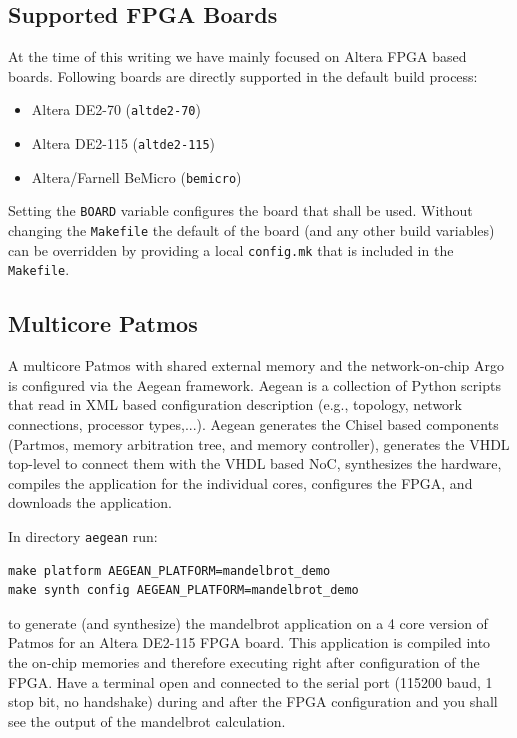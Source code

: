 \documentclass[a4paper,fontsize=10pt,twoside,DIV15,BCOR12mm,headinclude=true,footinclude=false,pagesize,bibtotoc]{scrbook}
\newcommand{\code}[1]{{\texttt{#1}}}
\newcommand{\comment}[3]{

\textsf{\textbf{#1}} {\color{#3}#2}}
\newcommand{\martin}[1]{\comment{Martin}{#1}{Blue}}
\renewcommand{\martin}[1]{}
\begin{document}
\martin{Where is the make target to run the emulator with an ELF file?}

\subsection{Supported FPGA Boards}

At the time of this writing we have mainly focused on Altera FPGA based boards. Following boards
are directly supported in the default build process:

\begin{itemize}
\item Altera DE2-70 (\code{altde2-70})
\item Altera DE2-115 (\code{altde2-115})
\item Altera/Farnell BeMicro (\code{bemicro})
\end{itemize}

Setting the \code{BOARD} variable configures the board that shall be used.
Without changing the \code{Makefile} the default of the board (and any other build variables)
can be overridden by providing a local \code{config.mk} that is included in the \code{Makefile}.

\subsection{Multicore Patmos}

A multicore Patmos with shared external memory and the network-on-chip Argo is configured via
the Aegean framework. Aegean is a collection of Python scripts that read in XML based configuration
description (e.g., topology, network connections, processor types,...). Aegean generates the Chisel based
components (Partmos, memory arbitration tree, and memory controller), generates the VHDL top-level
to connect them with the VHDL based NoC, synthesizes the hardware, compiles the application for the
individual cores, configures the FPGA, and downloads the application.

In directory \code{aegean} run:

\begin{verbatim}
make platform AEGEAN_PLATFORM=mandelbrot_demo
make synth config AEGEAN_PLATFORM=mandelbrot_demo
\end{verbatim}

to generate (and synthesize) the mandelbrot application on a 4 core
version of Patmos for an Altera DE2-115 FPGA board. This application is compiled
into the on-chip memories and therefore executing right after configuration of the
FPGA. Have a terminal open and connected to the serial port (115200 baud, 1 stop bit,
no handshake) during and after the FPGA configuration and you shall see the output of
the mandelbrot calculation.
\end{document}
